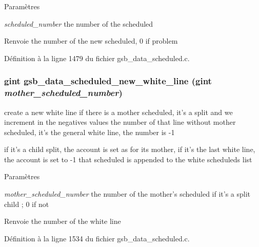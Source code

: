 \begin{DoxyParams}{Paramètres}
\item[{\em scheduled\_\-number}]the number of the scheduled\end{DoxyParams}
\begin{DoxyReturn}{Renvoie}
the number of the new scheduled, 0 if problem 
\end{DoxyReturn}


Définition à la ligne 1479 du fichier gsb\_\-data\_\-scheduled.c.

\subsubsection[{gsb\_\-data\_\-scheduled\_\-new\_\-white\_\-line}]{\setlength{\rightskip}{0pt plus 5cm}gint gsb\_\-data\_\-scheduled\_\-new\_\-white\_\-line (gint {\em mother\_\-scheduled\_\-number})}\label{gsb__data__scheduled_8c_ae06f8ce3a70b0bd8b4fe04b955c9c18b}
create a new white line if there is a mother scheduled, it's a split and we increment in the negatives values the number of that line without mother scheduled, it's the general white line, the number is -\/1

if it's a child split, the account is set as for its mother, if it's the last white line, the account is set to -\/1 that scheduled is appended to the white scheduleds list


\begin{DoxyParams}{Paramètres}
\item[{\em mother\_\-scheduled\_\-number}]the number of the mother's scheduled if it's a split child ; 0 if not\end{DoxyParams}
\begin{DoxyReturn}{Renvoie}
the number of the white line 
\end{DoxyReturn}


Définition à la ligne 1534 du fichier gsb\_\-data\_\-scheduled.c.

